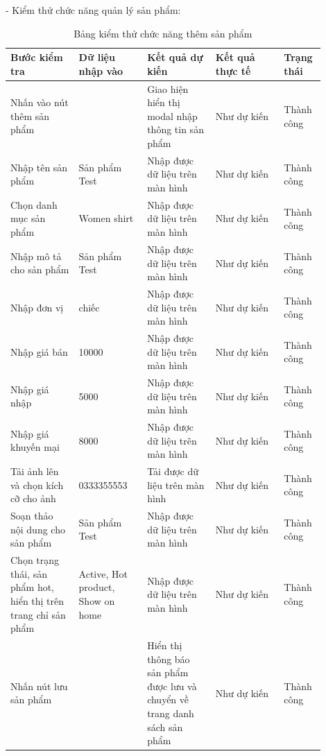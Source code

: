 - Kiểm thử chức năng quản lý sản phẩm:
\begin{longtable}[htp]{ |m{0.2\linewidth}|m{0.2\linewidth}|m{0.2\linewidth}|m{0.2\linewidth}|m{0.1\linewidth}|}
 \caption{Bảng kiểm thử chức năng thêm sản phẩm \label{updateProduct}}\\
 \hline
 Bước kiểm tra & Dữ liệu nhập vào & Kết quả dự kiến & Kết quả thực tế & Trạng thái \\
 \hline
  Nhấn vào nút thêm sản phẩm & & Giao hiện hiển thị modal nhập thông tin sản phẩm & Như dự kiến & Thành công\\
 \hline
   Nhập tên sản phẩm & Sản phẩm Test & Nhập được dữ liệu trên màn hình & Như dự kiến & Thành công\\
 \hline
   Chọn danh mục sản phẩm & Women shirt & Nhập được dữ liệu trên màn hình & Như dự kiến & Thành công\\
 \hline
   Nhập mô tả cho sản phẩm & Sản phẩm Test & Nhập được dữ liệu trên màn hình & Như dự kiến & Thành công\\
 \hline
   Nhập đơn vị & chiếc & Nhập được dữ liệu trên màn hình & Như dự kiến & Thành công\\
 \hline
   Nhập giá bán  & 10000 & Nhập được dữ liệu trên màn hình & Như dự kiến & Thành công\\
 \hline
   Nhập giá nhập & 5000 & Nhập được dữ liệu trên màn hình & Như dự kiến & Thành công\\
 \hline
   Nhập giá khuyến mại & 8000 & Nhập được dữ liệu trên màn hình & Như dự kiến & Thành công\\
 \hline
   Tải ảnh lên và chọn kích cỡ cho ảnh & 0333355553 & Tải được dữ liệu trên màn hình & Như dự kiến & Thành công\\
 \hline
   Soạn thảo nội dung cho sản phẩm & Sản phẩm Test & Nhập được dữ liệu trên màn hình & Như dự kiến & Thành công\\
 \hline
    Chọn trạng thái, sản phẩm hot, hiển thị trên trang chỉ sản phẩm & Active, Hot product, Show on home & Nhập được dữ liệu trên màn hình & Như dự kiến & Thành công\\
 \hline
    Nhấn nút lưu sản phẩm && Hiển thị thông báo sản phẩm được lưu và chuyển về trang danh sách sản phẩm  & Như dự kiến & Thành công\\
 \hline
\end{longtable}

